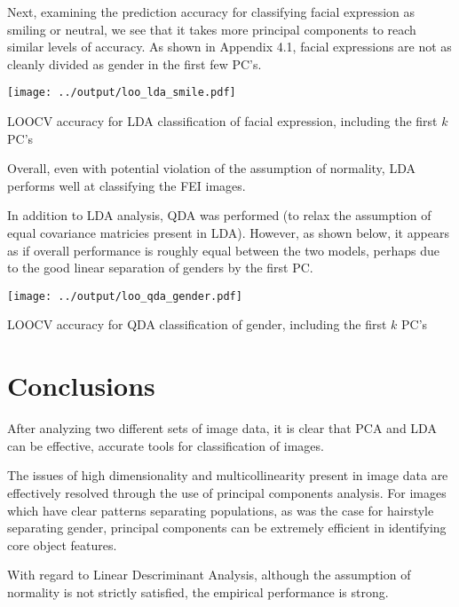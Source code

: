 \documentclass{article}
\begin{document}
\begin{multicols}{2}
  Next, examining the prediction accuracy for classifying facial expression as smiling or neutral, we see that it takes more principal components to reach similar levels of accuracy. As shown in Appendix 4.1, facial expressions are not as cleanly divided as gender in the first few PC's.
  
  \noindent
  \begin{minipage}{\columnwidth}
    \makeatletter
    \newcommand{\@captype}{figure}
    \makeatother
    \centering
    \texttt{[image: ../output/loo\_lda\_smile.pdf]}
    \caption{LOOCV accuracy for LDA classification of facial expression, including the first $k$ PC's}
  \end{minipage}
  
    \vspace{1em}
    Overall, even with potential violation of the assumption of normality, LDA performs well at classifying the FEI images.
    
    In addition to LDA analysis, QDA was performed (to relax the assumption of equal covariance matricies present in LDA). However, as shown below, it appears as if overall performance is roughly equal between the two models, perhaps due to the good linear separation of genders by the first PC.
    
  \noindent
  \begin{minipage}{\columnwidth}
    \makeatletter
    \newcommand{\@captype}{figure}
    \makeatother
    \centering
    \texttt{[image: ../output/loo\_qda\_gender.pdf]}
    \caption{LOOCV accuracy for QDA classification of gender, including the first $k$ PC's}
  \end{minipage}

  \section{Conclusions}
  
  After analyzing two different sets of image data, it is clear that PCA and LDA can be effective, accurate tools for classification of images.
  
  The issues of high dimensionality and multicollinearity present in image data are effectively resolved through the use of principal components analysis. For images which have clear patterns separating populations, as was the case for hairstyle separating gender, principal components can be extremely efficient in identifying core object features. 
  
  With regard to Linear Descriminant Analysis, although the assumption of normality is not strictly satisfied, the empirical performance is strong.
  

\end{multicols}
\end{document}
